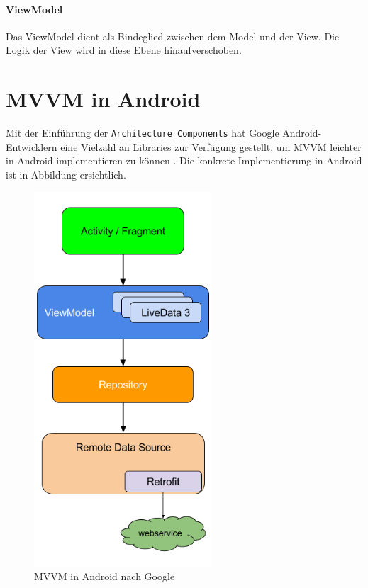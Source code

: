 \hypertarget{viewmodel}{%
\paragraph{ViewModel}\label{viewmodel}}

Das ViewModel dient als Bindeglied zwischen dem Model und der View. Die
Logik der View wird in diese Ebene hinaufverschoben.

\hypertarget{mvvm-in-android}{%
\section{MVVM in Android}\label{mvvm-in-android}}

Mit der Einführung der \texttt{Architecture\ Components} hat Google
Android-Entwicklern eine Vielzahl an Libraries zur Verfügung gestellt,
um MVVM leichter in Android implementieren zu können
\cite{mvvm-architecture-components}. Die konkrete Implementierung in
Android ist in Abbildung  ersichtlich.

\begin{figure}
\centering
\includegraphics[width=2.60417in,height=\textheight]{mvvm.png}
\caption{MVVM in Android nach Google \cite{mvvm} \cite{mvvm-bild}
\label{fig:mvvm}}
\end{figure}

